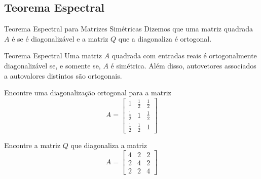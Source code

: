\subsection*{Teorema Espectral}

\begin{frame}[label=orto]{Teorema Espectral para Matrizes Simétricas}
Dizemos que uma matriz quadrada $A$ é  se é 
diagonalizável e a matriz $Q$ que a diagonaliza é ortogonal.

\begin{block}{Teorema Espectral}
Uma matriz  $A$ quadrada com entradas reais  é ortogonalmente diagonalizável se, e somente se, $A$ é simétrica. Além disso, autovetores associados a autovalores distintos são ortogonais.
\end{block}

\begin{exe}
Encontre  uma diagonalização ortogonal para a matriz
\[
A=
\begin{bmatrix}
1 & \frac{1}{2} & \frac{1}{2}\\[0.5em] 
\frac{1}{2} & 1 & \frac{1}{2}\\[0.5em]
 \frac{1}{2} & \frac{1}{2} & 1
\end{bmatrix}
\]
\end{exe}
\end{frame}

\begin{frame}[label=orto]{}
\begin{casa}
Encontre a matriz \(Q\) que diagonaliza a matriz
\[
A=\begin{bmatrix}
4 & 2 & 2 \\
2 & 4 & 2 \\
2 & 2 & 4
\end{bmatrix}
\]
\end{casa}
\end{frame}
